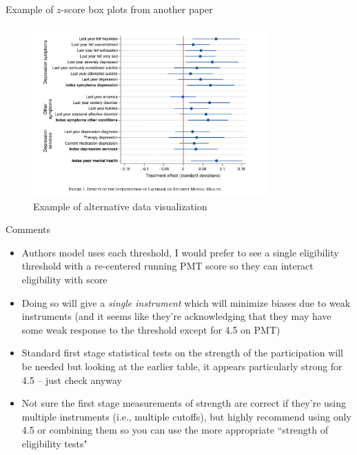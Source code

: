 \documentclass{beamer}
\begin{document}
\begin{frame}{Example of $z$-score box plots from another paper}
    \begin{figure}
        \centering
        \includegraphics[width=0.8\textwidth]{./lecture_includes/facebook_2.png}
        \caption{Example of alternative data visualization}
    \end{figure}
\end{frame}


\begin{frame}{Comments}

\begin{itemize}
\item Authors model uses each threshold, I would prefer to see a single eligibility threshold with a re-centered running PMT score so they can interact eligibility with score
\item Doing so will give a \emph{single instrument} which will minimize biases due to weak instruments (and it seems like they're acknowledging that they may have some weak response to the threshold except for 4.5 on PMT)
\item Standard first stage statistical tests on the strength of the participation will be needed but looking at the earlier table, it appears particularly strong for 4.5 -- just check anyway 
\item Not sure the first stage measurements of strength are correct if they're using multiple instruments (i.e., multiple cutoffs), but highly recommend using only 4.5 or combining them so you can use the more appropriate ``strength of eligibility tests"
\end{itemize}

\end{frame}
\end{document}
